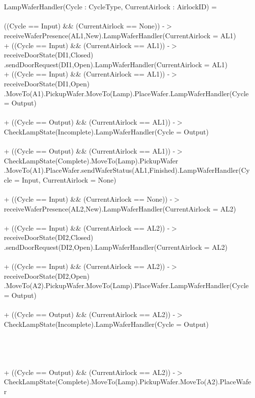 \documentclass[a4paper,12pt]{article}
\begin{document}
\\
\\LampWaferHandler(Cycle : CycleType, CurrentAirlock : AirlockID) = 
\\
\\((Cycle == Input) \&\& (CurrentAirlock == None)) -$>$ receiveWaferPresence(AL1,New).LampWaferHandler(CurrentAirlock = AL1)
\\+ ((Cycle == Input) \&\& (CurrentAirlock == AL1)) -$>$ receiveDoorState(DI1,Closed)
\\.sendDoorRequest(DI1,Open).LampWaferHandler(CurrentAirlock = AL1)
\\+ ((Cycle == Input) \&\& (CurrentAirlock == AL1)) -$>$ receiveDoorState(DI1,Open)
\\.MoveTo(A1).PickupWafer.MoveTo(Lamp).PlaceWafer.LampWaferHandler(Cycle = Output)
\\
\\+ ((Cycle == Output) \&\& (CurrentAirlock == AL1)) -$>$ CheckLampState(Incomplete).LampWaferHandler(Cycle = Output)
\\
\\+ ((Cycle == Output) \&\& (CurrentAirlock == AL1)) -$>$ CheckLampState(Complete).MoveTo(Lamp).PickupWafer
\\.MoveTo(A1).PlaceWafer.sendWaferStatus(AL1,Finished).LampWaferHandler(Cycle = Input, CurrentAirlock = None)
\\
\\+ ((Cycle == Input) \&\& (CurrentAirlock == None)) -$>$ receiveWaferPresence(AL2,New).LampWaferHandler(CurrentAirlock = AL2)
\\
\\+ ((Cycle == Input) \&\& (CurrentAirlock == AL2)) -$>$ receiveDoorState(DI2,Closed)
\\.sendDoorRequest(DI2,Open).LampWaferHandler(CurrentAirlock = AL2)
\\
\\+ ((Cycle == Input) \&\& (CurrentAirlock == AL2)) -$>$ receiveDoorState(DI2,Open)\\.MoveTo(A2).PickupWafer.MoveTo(Lamp).PlaceWafer.LampWaferHandler(Cycle = Output)
\\
\\+ ((Cycle == Output) \&\& (CurrentAirlock == AL2)) -$>$ CheckLampState(Incomplete).LampWaferHandler(Cycle = Output)
\\
\\
\\
\\
\\+ ((Cycle == Output) \&\& (CurrentAirlock == AL2)) -$>$ CheckLampState(Complete).MoveTo(Lamp).PickupWafer.MoveTo(A2).PlaceWafer
\end{document}
